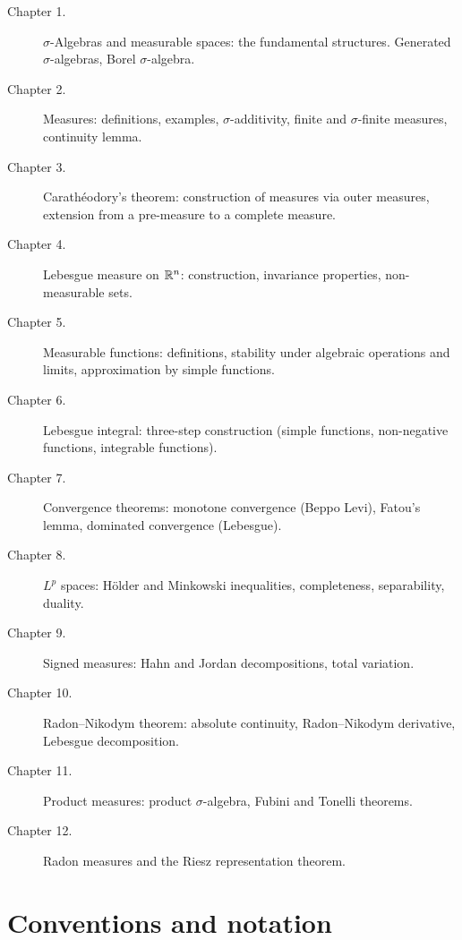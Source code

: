 \begin{description}
    \item[Chapter 1.] $\sigma$-Algebras and measurable spaces: the fundamental
    structures. Generated $\sigma$-algebras, Borel $\sigma$-algebra.
    \item[Chapter 2.] Measures: definitions, examples, $\sigma$-additivity,
    finite and $\sigma$-finite measures, continuity lemma.
    \item[Chapter 3.] Carath\'eodory's theorem: construction of measures via outer
    measures, extension from a pre-measure to a complete measure.
    \item[Chapter 4.] Lebesgue measure on $\mathbb{R}^n$: construction, invariance
    properties, non-measurable sets.
    \item[Chapter 5.] Measurable functions: definitions, stability under algebraic
    operations and limits, approximation by simple functions.
    \item[Chapter 6.] Lebesgue integral: three-step construction (simple functions,
    non-negative functions, integrable functions).
    \item[Chapter 7.] Convergence theorems: monotone convergence (Beppo Levi),
    Fatou's lemma, dominated convergence (Lebesgue).
    \item[Chapter 8.] $L^p$ spaces: H\"older and Minkowski inequalities,
    completeness, separability, duality.
    \item[Chapter 9.] Signed measures: Hahn and Jordan decompositions, total
    variation.
    \item[Chapter 10.] Radon--Nikodym theorem: absolute continuity, Radon--Nikodym
    derivative, Lebesgue decomposition.
    \item[Chapter 11.] Product measures: product $\sigma$-algebra, Fubini and
    Tonelli theorems.
    \item[Chapter 12.] Radon measures and the Riesz representation theorem.
\end{description}

\section*{Conventions and notation}

